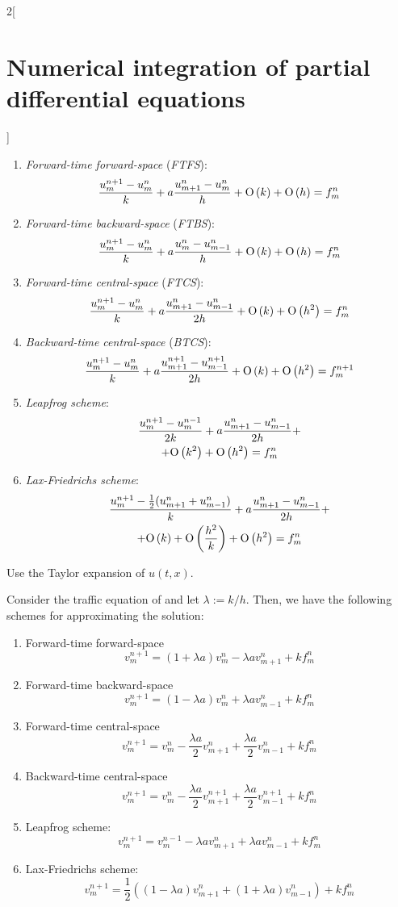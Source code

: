 \documentclass[../../../main_math.tex]{subfiles}
\begin{document}
\begin{multicols}{2}[\section{Numerical integration of partial differential equations}]
\begin{proposition}
\begin{enumerate}
      \item \emph{Forward-time forward-space} (\emph{FTFS}):
            $$\frac{u_m^{n+1}-u_m^n}{k}+a\frac{u_{m+1}^n-u_m^n}{h}+\mathrm{O}\left(k\right)+\mathrm{O}\left(h\right)=f_m^n$$
      \item \emph{Forward-time backward-space} (\emph{FTBS}):
            $$\frac{u_m^{n+1}-u_m^n}{k}+a\frac{u_{m}^n-u_{m-1}^n}{h}+\mathrm{O}\left(k\right)+\mathrm{O}\left(h\right)=f_m^n$$
      \item \emph{Forward-time central-space} (\emph{FTCS}):
            $$\frac{u_m^{n+1}-u_m^n}{k}+a\frac{u_{m+1}^n-u_{m-1}^n}{2h}+\mathrm{O}\left(k\right)+\mathrm{O}\left(h^2\right)=f_m^n$$
      \item \emph{Backward-time central-space} (\emph{BTCS}):
            $$\frac{u_m^{n+1}-u_m^n}{k}+a\frac{u_{m+1}^{n+1}-u_{m-1}^{n+1}}{2h}+\mathrm{O}\left(k\right)+\mathrm{O}\left(h^2\right)=f_m^{n+1}$$
      \item \emph{Leapfrog scheme}:
            \begin{multline*}
              \frac{u_m^{n+1}-u_m^{n-1}}{2k}+a\frac{u_{m+1}^n-u_{m-1}^n}{2h}+\\+\mathrm{O}\left(k^2\right)+\mathrm{O}\left(h^2\right)=f_m^n
            \end{multline*}
      \item \emph{Lax-Friedrichs scheme}:
            \begin{multline*}
              \frac{u_m^{n+1}-\frac{1}{2}(u_{m+1}^n+u_{m-1}^n)}{k}+a\frac{u_{m+1}^n-u_{m-1}^n}{2h} + \\ + \mathrm{O}\left(k\right)+\mathrm{O}\left(\frac{h^2}{k}\right)+\mathrm{O}\left(h^2\right)=f_m^n
            \end{multline*}
    \end{enumerate}
  \end{proposition}
  \begin{sproof}
    Use the Taylor expansion of $u(t,x)$.
  \end{sproof}
  \begin{corollary}
    Consider the traffic equation of  and let $\lambda:=k/h$. Then, we have the following schemes for approximating the solution:
    \begin{enumerate}
      \item Forward-time forward-space
            $$\displaystyle v_m^{n+1}=(1+\lambda a)v_m^n-\lambda av_{m+1}^n+kf_m^n$$
      \item Forward-time backward-space
            $$\displaystyle v_m^{n+1}=(1-\lambda a)v_m^n+\lambda av_{m-1}^n+kf_m^n$$
      \item Forward-time central-space
            $$\displaystyle v_m^{n+1}=v_m^n-\frac{\lambda a}{2}v_{m+1}^n+\frac{\lambda a}{2}v_{m-1}^n+kf_m^n$$
      \item Backward-time central-space
            $$
              \displaystyle v_m^{n+1}=v_m^n-\frac{\lambda a}{2}v_{m+1}^{n+1}+\frac{\lambda a}{2}v_{m-1}^{n+1}+kf_m^n
            $$
      \item Leapfrog scheme: $$v_m^{n+1}=v_m^{n-1}-\lambda av_{m+1}^n+\lambda av_{m-1}^n+kf_m^n$$
      \item Lax-Friedrichs scheme: $$v_m^{n+1}=\frac{1}{2}\left((1-\lambda a)v_{m+1}^n+(1+\lambda a)v_{m-1}^n\right)+kf_m^n$$
    \end{enumerate}
  \end{corollary}

\end{multicols}
\end{document}
